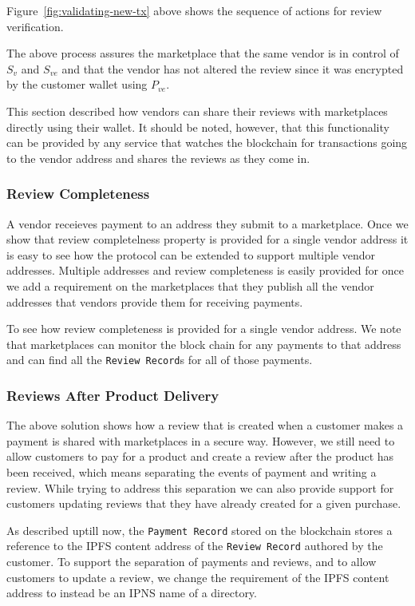 \documentclass[a4paper]{article}
\begin{document}
Figure~\ref{fig:validating-new-tx} above shows the sequence of actions
for review verification.

The above process assures the marketplace that the same vendor is in
control of $S_v$ and $S_{ve}$ and that the vendor has not altered the review
since it was encrypted by the customer wallet using $P_{ve}$.

This section described how vendors can share their reviews with
marketplaces directly using their wallet. It should be noted, however,
that this functionality can be provided by any service that watches
the blockchain for transactions going to the vendor address and shares
the reviews as they come in.

\subsubsection{Review Completeness}

A vendor receieves payment to an address they submit to a marketplace.
Once we show that review completelness property is provided for a
single vendor address it is easy to see how the protocol can be
extended to support multiple vendor addresses. Multiple addresses and
review completeness is easily provided for once we add a requirement
on the marketplaces that they publish all the vendor addresses that
vendors provide them for receiving payments.

To see how review completeness is provided for a single vendor
address. We note that marketplaces can monitor the block chain for any
payments to that address and can find all the \texttt{Review Record}s
for all of those payments.

\subsubsection{Reviews After Product Delivery}

The above solution shows how a review that is created when a customer
makes a payment is shared with marketplaces in a secure way. However,
we still need to allow customers to pay for a product and create a
review after the product has been received, which means separating the
events of payment and writing a review. While trying to address this
separation we can also provide support for customers updating reviews
that they have already created for a given purchase.

As described uptill now, the \texttt{Payment Record} stored on the
blockchain stores a reference to the IPFS content address of the
\texttt{Review Record} authored by the customer. To support the
separation of payments and reviews, and to allow customers to update a
review, we change the requirement of the IPFS content address to
instead be an IPNS name of a directory.
\end{document}
